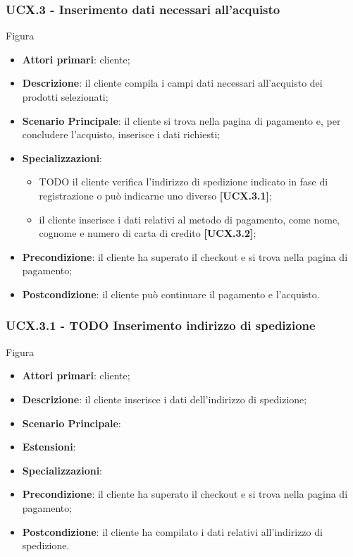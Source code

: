 \subsubsection{UCX.3 - Inserimento dati necessari all'acquisto}
Figura \\
\begin{itemize}
\item \textbf{Attori primari}: cliente;
\item \textbf{Descrizione}: il cliente compila i campi dati necessari all'acquisto dei prodotti selezionati;
\item \textbf{Scenario Principale}: il cliente si trova nella pagina di pagamento e, per concludere l'acquisto, inserisce i dati richiesti;
\item \textbf{Specializzazioni}:
\begin{itemize}
	\item TODO il cliente verifica l'indirizzo di spedizione indicato in fase di registrazione o può indicarne uno diverso \textbf{[UCX.3.1]};
	\item il cliente inserisce i dati relativi al metodo di pagamento, come nome, cognome e numero di carta di credito \textbf{[UCX.3.2]};
\end{itemize}
\item \textbf{Precondizione}: il cliente ha superato il checkout e si trova nella pagina di pagamento;
\item \textbf{Postcondizione}: il cliente può continuare il pagamento e l'acquisto.
\end{itemize}

\subsubsection{UCX.3.1 - TODO Inserimento indirizzo di spedizione}
Figura \\
\begin{itemize}
\item \textbf{Attori primari}: cliente;
\item \textbf{Descrizione}: il cliente inserisce i dati dell'indirizzo di spedizione;
\item \textbf{Scenario Principale}: 
\item \textbf{Estensioni}:
\item \textbf{Specializzazioni}:
\item \textbf{Precondizione}: il cliente ha superato il checkout e si trova nella pagina di pagamento;
\item \textbf{Postcondizione}: il cliente ha compilato i dati relativi all'indirizzo di spedizione.
\end{itemize}

